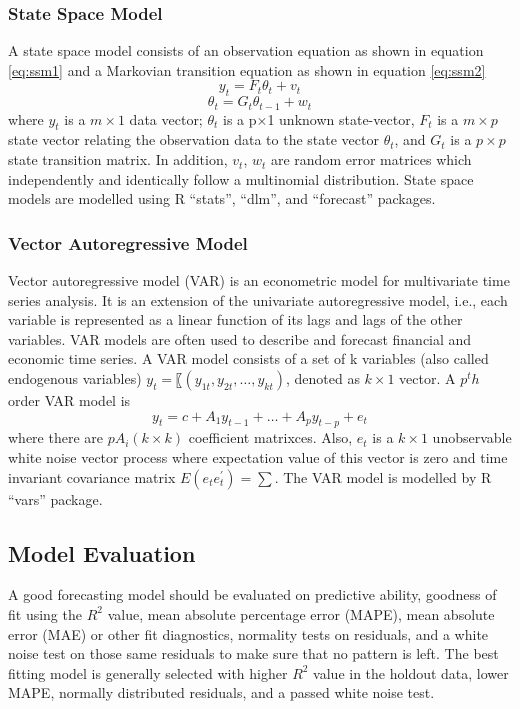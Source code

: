 \subsubsection{State Space Model}
A state space model consists of an observation equation as shown in equation \ref{eq:ssm1} and a Markovian transition equation as shown in equation \ref{eq:ssm2} 
\begin{equation}
y_t=F_t \theta_t +v_t
\label{eq:ssm1}
\end{equation}
\begin{equation}
\theta_t=G_t\theta_{t-1} + w_t
\label{eq:ssm2}
\end{equation}
where $y_t$ is a $m \times 1$ data vector; $θ_t$  is a p×1 unknown state-vector, $F_t$ is a $m\times p$ state vector relating the observation data to the state vector $θ_t$, and $G_t$ is a $p\times p$ state transition matrix. In addition, $v_t$, $w_t$ are random error matrices which independently and identically follow a multinomial distribution. State space models are modelled using R “stats”, “dlm”, and “forecast” packages. 

\subsubsection{Vector Autoregressive Model}
Vector autoregressive model (VAR) is an econometric model for multivariate time series analysis. It is an extension of the univariate autoregressive model, i.e., each variable is represented as a linear function of its lags and lags of the other variables. VAR models are often used to describe and forecast financial and economic time series. A VAR model consists of a set of k variables (also called endogenous variables) $y_t=〖(y_{1t}, y_{2t}, \dots, y_{kt})$, denoted as $k\times1$ vector. A $p^th$ order VAR model is 
\begin{equation}
y_t=c+A_1y_{t-1}+\dots +A_py_{t-p}+e_t
\end{equation}
where there are $pA_i(k \times k)$ coefficient matrixces. Also, $e_t$  is a $k \times 1$ unobservable white noise vector process where expectation value of this vector is zero and time invariant covariance matrix $E(e_t e_t^{'})=\sum$. The VAR model is modelled by R “vars” package.
\subsection{Model Evaluation}
A good forecasting model should be evaluated on predictive ability, goodness of fit using the $R^2$ value, mean absolute percentage error (MAPE), mean absolute error (MAE) or other fit diagnostics, normality tests on residuals, and a white noise test on those same residuals to make sure that no pattern is left. The best fitting model is generally selected with higher $R^2$ value in the holdout data, lower MAPE, normally distributed residuals, and a passed white noise test.

